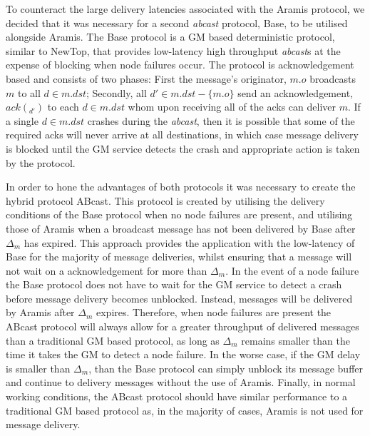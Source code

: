     To counteract the large delivery latencies associated with the \textsf{Aramis} protocol, we decided that it was necessary for a second \emph{abcast} protocol, \textsf{Base}, to be utilised alongside \textsf{Aramis}.  The \textsf{Base} protocol is a GM based deterministic protocol, similar to NewTop\citep{Ezhilchelvan:1995:NFG:876885.880005}, that provides low-latency high throughput \emph{abcast}s at the expense of blocking when node failures occur. The protocol is acknowledgement based and consists of two phases: First the message's originator, $m.o$ broadcasts $m$ to all $d \in m.dst$; Secondly, all $d' \in m.dst - \{m.o\}$ send an acknowledgement, $ack(_{d'})$  to each $d \in m.dst$ whom upon receiving all of the acks can deliver $m$.  If a single $d \in m.dst$ crashes during the \emph{abcast},  then it is possible that some of the required acks will never arrive at all destinations, in which case message delivery is blocked until the GM service detects the crash and appropriate action is taken by the protocol.  
    
    In order to hone the advantages of both protocols it was necessary to create the hybrid protocol \textsf{ABcast}.  This protocol is created by utilising the delivery conditions of the \textsf{Base} protocol when no node failures are present, and utilising those of \textsf{Aramis} when a broadcast message has not been delivered by \textsf{Base} after $\Delta_m$ has expired.  This approach provides the application with the low-latency of \textsf{Base} for the majority of message deliveries, whilst ensuring that a message will not wait on a acknowledgement for more than $\Delta_m$.  In the event of a node failure the \textsf{Base} protocol does not have to wait for the GM service to detect a crash before message delivery becomes unblocked.  Instead, messages will be delivered by \textsf{Aramis} after $\Delta_m$ expires.  Therefore, when node failures are present the \textsf{ABcast} protocol will always allow for a greater throughput of delivered messages than a traditional GM based protocol, as long as $\Delta_m$ remains smaller than the time it takes the GM to detect a node failure.  In the worse case, if the GM delay is smaller than $\Delta_m$, than the \textsf{Base} protocol can simply unblock its message buffer and continue to delivery messages without the use of \textsf{Aramis}.  Finally, in normal working conditions, the \textsf{ABcast} protocol should have similar performance to a traditional GM based protocol as, in the majority of cases, \textsf{Aramis} is not used for message delivery.  


